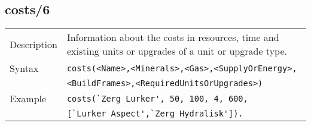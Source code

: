 \subsection{costs/6}
\begin{tabularx}{\textwidth}{lX}
 Description & Information about the costs in resources, time and existing units or upgrades of a unit or upgrade type. \\
 Syntax & \verb|costs(<Name>,<Minerals>,<Gas>,<SupplyOrEnergy>,| \\ & \quad \verb|<BuildFrames>,<RequiredUnitsOrUpgrades>)| \\
 Example & \verb|costs(`Zerg Lurker', 50, 100, 4, 600,| \\ & \quad \verb|[`Lurker Aspect',`Zerg Hydralisk']).| \\
 \end{tabularx}
